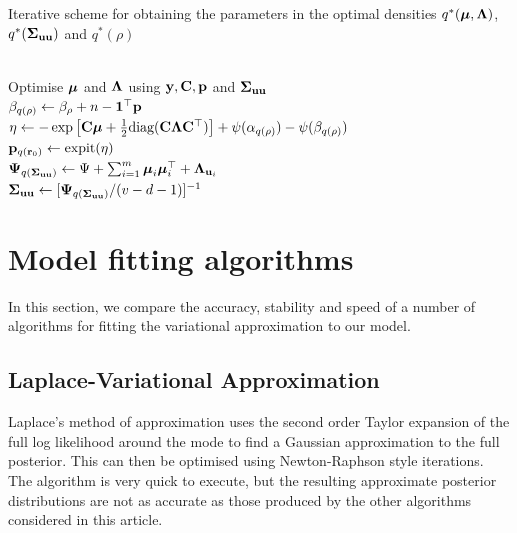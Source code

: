 \documentclass{article}[12pt]
\begin{document}
\begin{algorithm}
\caption[Algorithm 1]{Iterative scheme for obtaining the parameters in the
optimal densities $q^*({\boldsymbol \mu}, {\boldsymbol \Lambda})$, $q^*({\boldsymbol \Sigma}_{{\bf u} {\bf u}})$ and $q^*(\rho)$}
\label{alg:algorithm_one}
\begin{algorithmic}
 \\[1ex]
\STATE Optimise ${\boldsymbol \mu}$ and ${\boldsymbol \Lambda}$ using ${\bf y}, {\bf C}, {\bf p}$ and ${\boldsymbol \Sigma}_{{\bf u} {\bf u}}$ \\[1ex]
\STATE $\beta_{q(\rho)} \leftarrow \beta_\rho + n - {\bf 1}^\top{\bf p}$ \\[1ex]
\STATE $\eta \leftarrow -\exp \left [ {\bf C} {\boldsymbol \mu} + {\frac{1}{2}} \text{diag}{({\bf C}{\boldsymbol\Lambda}{\bf C}^\top)} \right ] + \psi{(\alpha_{q{(\rho)}})} - \psi{(\beta_{q{(\rho)}})}$ \\[1ex]
\STATE ${\bf p}_{q({\bf r}_0)} \leftarrow \text{expit} (\eta)$ \\[1ex]
\STATE ${\boldsymbol \Psi}_{q({\boldsymbol \Sigma}_{{\bf u} {\bf u}})} \leftarrow \Psi + \sum_{i=1}^m {\boldsymbol \mu}_i {\boldsymbol \mu}_i^\top + {\boldsymbol \Lambda}_{{{\bf u}}_i}$ \\[1ex]
\STATE ${\boldsymbol \Sigma}_{{\bf u}{\bf u}} \leftarrow [{\boldsymbol \Psi}_{q({\boldsymbol \Sigma}_{{\bf u} {\bf u}})}/(v - d - 1)]^{-1}$
\ENDWHILE
\end{algorithmic}
\end{algorithm}

\section{Model fitting algorithms}
\label{sec:algorithms}

In this section, we compare the accuracy, stability and speed of a number of algorithms for fitting the
variational approximation to our model.

\subsection{Laplace-Variational Approximation}

Laplace's method of approximation uses the second order Taylor expansion of the full log likelihood around the
mode to find a Gaussian approximation to the full posterior. This can then be optimised using Newton-Raphson
style iterations. The algorithm is very quick to execute, but the resulting approximate posterior
distributions are not as accurate as those produced by the other algorithms considered in this article.
\end{document}
